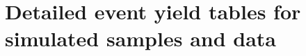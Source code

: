 \chapter{Detailed event yield tables for simulated samples and data}


\renewcommand{\arraystretch}{1.1}
\begin{table}[!h]
\centering
\caption{Event yields after each selection step for various background processes. FIXME update this table!!}
\label{tab:CutflowMC}
\end{table}
